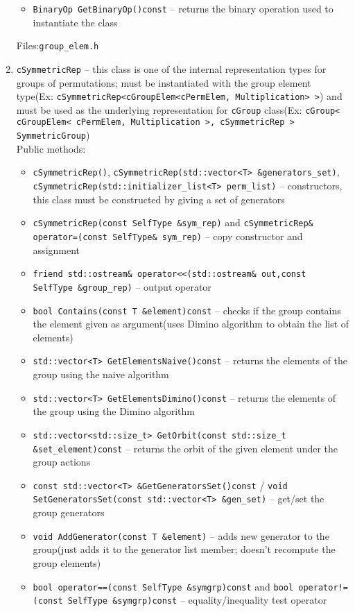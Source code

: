 \documentclass[a4paper,11pt]{article}
\begin{document}
\begin{enumerate}
\begin{itemize}
\item
\verb=BinaryOp GetBinaryOp()const= -- returns the binary operation used to instantiate the class
\end{itemize}
Files:\verb=group_elem.h=
\item
\verb=cSymmetricRep= -- this class is one of the internal representation types for groups of permutations; must be instantiated with the group element type(Ex: \verb=cSymmetricRep<cGroupElem<cPermElem, Multiplication> >=) and must be used as the underlying representation for \verb=cGroup= class(Ex: \verb=cGroup< cGroupElem< cPermElem, Multiplication >, cSymmetricRep > SymmetricGroup=)\\
Public methods:
\begin{itemize}
\item
\verb=cSymmetricRep()=, \verb=cSymmetricRep(std::vector<T> &generators_set)=, \verb=cSymmetricRep(std::initializer_list<T> perm_list)= -- constructors, this class must be constructed by giving a set of generators
\item
\verb=cSymmetricRep(const SelfType &sym_rep)= and \verb+cSymmetricRep& operator=(const SelfType& sym_rep)+ -- copy constructor and assignment
\item
\verb=friend std::ostream& operator<<(std::ostream& out,const SelfType &group_rep)= -- output operator
\item
\verb=bool Contains(const T &element)const= -- checks if the group contains the element given as argument(uses Dimino algorithm to obtain the list of elements)
\item
\verb=std::vector<T> GetElementsNaive()const= -- returns the elements of the group using the naive algorithm
\item
\verb=std::vector<T> GetElementsDimino()const= -- returns the elements of the group using the Dimino algorithm
\item
\verb=std::vector<std::size_t> GetOrbit(const std::size_t &set_element)const= -- returns the orbit of the given element under the group actions
\item
\verb=const std::vector<T> &GetGeneratorsSet()const= / \verb=void SetGeneratorsSet(const std::vector<T> &gen_set)= -- get/set the group generators
\item
\verb=void AddGenerator(const T &element)= -- adds new generator to the group(just adds it to the generator list member; doesn't recompute the group elements)
\item
\verb+bool operator==(const SelfType &symgrp)const+ and \verb+bool operator!=(const SelfType &symgrp)const+ -- equality/inequality test operator

\end{itemize}
\end{enumerate}
\end{document}
